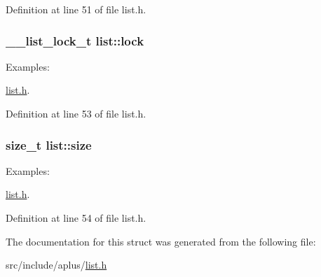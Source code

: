 Definition at line 51 of file list.\+h.

\hypertarget{structlist_a59893e59e3f090a886894244b0dc0643}{
\subsubsection[{lock}]{\setlength{\rightskip}{0pt plus 5cm}\+\_\+\+\_\+list\+\_\+lock\+\_\+t list\+::lock}}\label{structlist_a59893e59e3f090a886894244b0dc0643}
\begin{Desc}
\item[Examples\+: ]\par
\hyperlink{list_8h-example}{list.\+h}.\end{Desc}


Definition at line 53 of file list.\+h.

\hypertarget{structlist_ae581be90bd8eb7051528b61ad216de88}{
\subsubsection[{size}]{\setlength{\rightskip}{0pt plus 5cm}size\+\_\+t list\+::size}}\label{structlist_ae581be90bd8eb7051528b61ad216de88}
\begin{Desc}
\item[Examples\+: ]\par
\hyperlink{list_8h-example}{list.\+h}.\end{Desc}


Definition at line 54 of file list.\+h.



The documentation for this struct was generated from the following file\+:\begin{DoxyCompactItemize}
\item 
src/include/aplus/\hyperlink{list_8h}{list.\+h}\end{DoxyCompactItemize}
